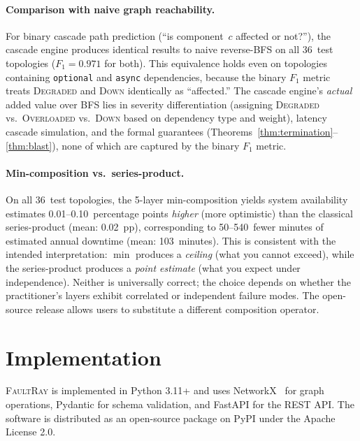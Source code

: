 \documentclass[10pt,twocolumn]{article}
\begin{document}
\paragraph{Comparison with naive graph reachability.}
For binary cascade path prediction (``is component~$c$ affected
or not?''), the cascade engine produces identical results to
naive reverse-BFS on all 36~test topologies ($F_1 = 0.971$ for
both). This equivalence holds even on topologies containing
\texttt{optional} and \texttt{async} dependencies, because the
binary $F_1$ metric treats \textsc{Degraded} and \textsc{Down}
identically as ``affected.'' The cascade engine's \emph{actual}
added value over BFS lies in severity differentiation
(assigning \textsc{Degraded} vs.\ \textsc{Overloaded} vs.\
\textsc{Down} based on dependency type and weight), latency
cascade simulation, and the formal guarantees
(Theorems~\ref{thm:termination}--\ref{thm:blast}), none of
which are captured by the binary $F_1$ metric.

\paragraph{Min-composition vs.\ series-product.}
On all 36~test topologies, the 5-layer min-composition yields
system availability estimates 0.01--0.10~percentage points
\emph{higher} (more optimistic) than the classical
series-product (mean: 0.02~pp), corresponding to
50--540~fewer minutes of estimated annual downtime
(mean: 103~minutes). This is consistent with the
intended interpretation: $\min$ produces a \emph{ceiling}
(what you cannot exceed), while the series-product produces
a \emph{point estimate} (what you expect under independence).
Neither is universally correct; the choice depends on whether
the practitioner's layers exhibit correlated or independent
failure modes. The open-source release allows users to
substitute a different composition operator.

\section{Implementation}\label{sec:impl}

\textsc{FaultRay} is implemented in Python 3.11+ and uses NetworkX~\cite{networkx}
for graph operations, Pydantic for schema validation, and FastAPI for
the REST API.  The software is distributed as an open-source package on
PyPI under the Apache License 2.0.
\end{document}
